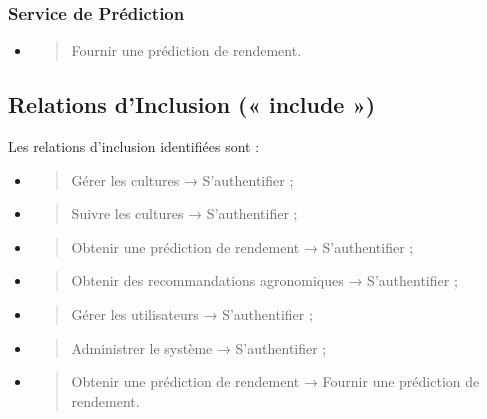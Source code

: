 \hypertarget{service-de-pruxe9diction-1}{%
\subsubsection{Service de Prédiction}\label{service-de-pruxe9diction-1}}

\begin{itemize}
\item
  \begin{quote}
  Fournir une prédiction de rendement.
  \end{quote}
\end{itemize}

\hypertarget{relations-dinclusion-include}{%
\subsection{Relations d'Inclusion (« include
»)}\label{relations-dinclusion-include}}

Les relations d'inclusion identifiées sont :

\begin{itemize}
\item
  \begin{quote}
  Gérer les cultures → S'authentifier ;
  \end{quote}
\item
  \begin{quote}
  Suivre les cultures → S'authentifier ;
  \end{quote}
\item
  \begin{quote}
  Obtenir une prédiction de rendement → S'authentifier ;
  \end{quote}
\item
  \begin{quote}
  Obtenir des recommandations agronomiques → S'authentifier ;
  \end{quote}
\item
  \begin{quote}
  Gérer les utilisateurs → S'authentifier ;
  \end{quote}
\item
  \begin{quote}
  Administrer le système → S'authentifier ;
  \end{quote}
\item
  \begin{quote}
  Obtenir une prédiction de rendement → Fournir une prédiction de
  rendement.
  \end{quote}
\end{itemize}

